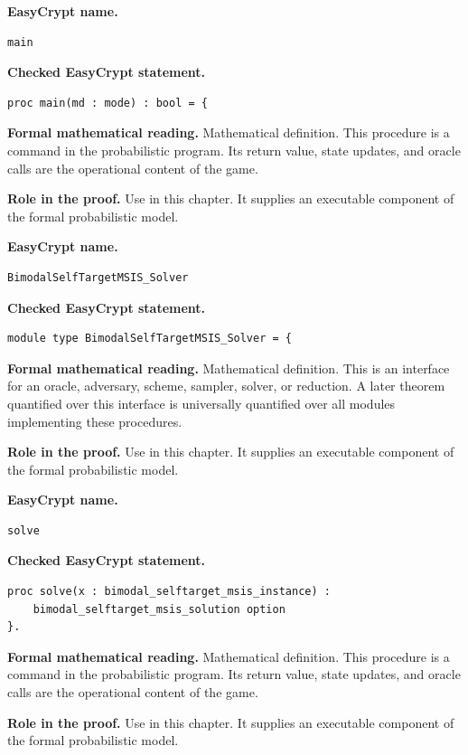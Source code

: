 \begin{formaldefinition}
\noindent\textbf{EasyCrypt name.}
\begin{lstlisting}[language=EasyCrypt,basicstyle=\ttfamily\scriptsize]
main
\end{lstlisting}
\noindent\textbf{Checked EasyCrypt statement.}
\begin{lstlisting}[language=EasyCrypt,basicstyle=\ttfamily\scriptsize]
proc main(md : mode) : bool = {
\end{lstlisting}
\noindent\textbf{Formal mathematical reading.}
Mathematical definition. This procedure is a command in the probabilistic program.  Its return value, state updates, and oracle calls are the operational content of the game.

\noindent\textbf{Role in the proof.}
Use in this chapter. It supplies an executable component of the formal probabilistic model.

\end{formaldefinition}

\begin{formaldefinition}
\noindent\textbf{EasyCrypt name.}
\begin{lstlisting}[language=EasyCrypt,basicstyle=\ttfamily\scriptsize]
BimodalSelfTargetMSIS_Solver
\end{lstlisting}
\noindent\textbf{Checked EasyCrypt statement.}
\begin{lstlisting}[language=EasyCrypt,basicstyle=\ttfamily\scriptsize]
module type BimodalSelfTargetMSIS_Solver = {
\end{lstlisting}
\noindent\textbf{Formal mathematical reading.}
Mathematical definition. This is an interface for an oracle, adversary, scheme, sampler, solver, or reduction.  A later theorem quantified over this interface is universally quantified over all modules implementing these procedures.

\noindent\textbf{Role in the proof.}
Use in this chapter. It supplies an executable component of the formal probabilistic model.

\end{formaldefinition}

\begin{formaldefinition}
\noindent\textbf{EasyCrypt name.}
\begin{lstlisting}[language=EasyCrypt,basicstyle=\ttfamily\scriptsize]
solve
\end{lstlisting}
\noindent\textbf{Checked EasyCrypt statement.}
\begin{lstlisting}[language=EasyCrypt,basicstyle=\ttfamily\scriptsize]
proc solve(x : bimodal_selftarget_msis_instance) :
    bimodal_selftarget_msis_solution option
}.
\end{lstlisting}
\noindent\textbf{Formal mathematical reading.}
Mathematical definition. This procedure is a command in the probabilistic program.  Its return value, state updates, and oracle calls are the operational content of the game.

\noindent\textbf{Role in the proof.}
Use in this chapter. It supplies an executable component of the formal probabilistic model.

\end{formaldefinition}

